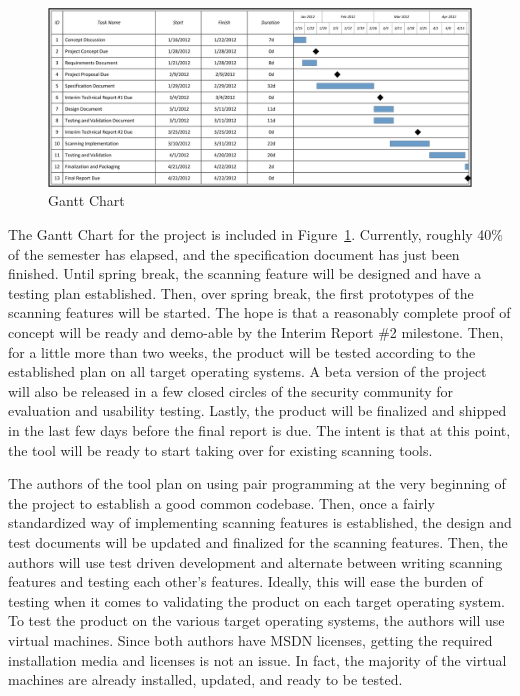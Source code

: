 \documentclass[letterpaper,12pt]{article}
\begin{document}
\begin{figure}[h]
  	\centering
	\includegraphics[scale=.7]{figures/GanttChart.png}
  	\caption{Gantt Chart}
  	\label{gantt}
\end{figure}

The Gantt Chart for the project is included in Figure~\ref{gantt}.  Currently,
roughly 40\% of the semester has elapsed, and the specification document has
just been finished.  Until spring break, the scanning feature will be designed
and have a testing plan established.  Then, over spring break, the first
prototypes of the scanning features will be started.  The hope is that a
reasonably complete proof of concept will be ready and demo-able by the Interim
Report \#2 milestone.  Then, for a little more than two weeks, the product will
be tested according to the established plan on all target operating systems.  A
beta version of the project will also be released in a few closed circles of the
security community for evaluation and usability testing.  Lastly, the product
will be finalized and shipped in the last few days before the final report is
due.  The intent is that at this point, the tool will be ready to start taking
over for existing scanning tools.  

The authors of the tool plan on using pair programming at the very beginning of
the project to establish a good common codebase.  Then, once a fairly
standardized way of implementing scanning features is established, the design
and test documents will be updated and finalized for the scanning features. 
Then, the authors will use test driven development and alternate between writing
scanning features and testing each other's features.  Ideally, this will ease
the burden of testing when it comes to validating the product on each target
operating system.  To test the product on the various target operating systems,
the authors will use virtual machines.  Since both authors have MSDN licenses,
getting the required installation media and licenses is not an issue.  In fact,
the majority of the virtual machines are already installed, updated, and ready
to be tested.  
\end{document}
